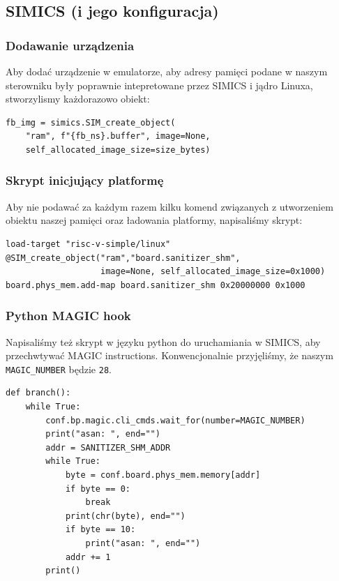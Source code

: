 \documentclass[../main.tex]{subfiles}
\begin{document}
\subsection{SIMICS (i jego konfiguracja)}
\subsubsection{Dodawanie urządzenia}
Aby dodać urządzenie w emulatorze, aby adresy pamięci podane w naszym sterowniku były poprawnie intepretowane przez SIMICS i jądro Linuxa, stworzylismy każdorazowo obiekt:
	\begin{listing}[H]
		\begin{verbatim}
fb_img = simics.SIM_create_object(
	"ram", f"{fb_ns}.buffer", image=None,
	self_allocated_image_size=size_bytes)
		\end{verbatim}
	\end{listing}
\subsubsection{Skrypt inicjujący platformę}
Aby nie podawać za każdym razem kilku komend związanych z utworzeniem obiektu naszej pamięci oraz ładowania platformy, napisaliśmy skrypt:
	\begin{listing}[H]
	\begin{verbatim}
load-target "risc-v-simple/linux"
@SIM_create_object("ram","board.sanitizer_shm",
                   image=None, self_allocated_image_size=0x1000)
board.phys_mem.add-map board.sanitizer_shm 0x20000000 0x1000
	\end{verbatim}
\end{listing}

\subsubsection{Python MAGIC hook}
Napisaliśmy też skrypt w języku python do uruchamiania w SIMICS, aby przechwtywać MAGIC instructions.
Konwencjonalnie przyjęliśmy, że naszym \texttt{MAGIC_NUMBER} będzie \texttt{28}.
	\begin{listing}[H]
	\begin{verbatim}
def branch():
	while True:
		conf.bp.magic.cli_cmds.wait_for(number=MAGIC_NUMBER)
		print("asan: ", end="")
		addr = SANITIZER_SHM_ADDR
		while True:
			byte = conf.board.phys_mem.memory[addr]
			if byte == 0:
				break
			print(chr(byte), end="")
			if byte == 10:
				print("asan: ", end="")
			addr += 1
		print()
	\end{verbatim}
\end{listing}
\end{document}
